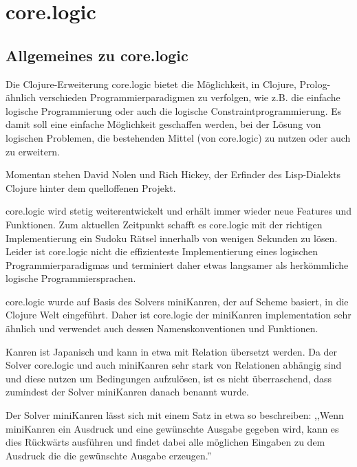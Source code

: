 \section{core.logic} 

\subsection{Allgemeines zu core.logic}

Die Clojure-Erweiterung core.logic bietet die Möglichkeit, in Clojure, Prolog-ähnlich verschieden Programmierparadigmen zu verfolgen, wie z.B. die einfache logische Programmierung oder auch die logische Constraintprogrammierung. Es damit soll eine einfache Möglichkeit geschaffen werden, bei der Lösung von logischen Problemen, die bestehenden Mittel (von core.logic) zu nutzen oder auch zu erweitern.

Momentan stehen David Nolen und Rich Hickey, der Erfinder des Lisp-Dialekts Clojure hinter dem quelloffenen Projekt.

core.logic wird stetig weiterentwickelt und erhält immer wieder neue Features und Funktionen. Zum aktuellen Zeitpunkt schafft es core.logic mit der richtigen Implementierung ein Sudoku Rätsel innerhalb von wenigen Sekunden zu lösen. Leider ist core.logic nicht die effizienteste Implementierung eines logischen Programmierparadigmas und terminiert daher etwas langsamer als herkömmliche logische Programmiersprachen.

core.logic wurde auf Basis des Solvers miniKanren, der auf Scheme basiert, in die Clojure Welt eingeführt. Daher ist core.logic der miniKanren implementation sehr ähnlich und verwendet auch dessen Namenskonventionen und Funktionen.

Kanren ist Japanisch und kann in etwa mit Relation übersetzt werden. Da der Solver core.logic und auch miniKanren sehr stark von Relationen abhängig sind und diese nutzen um Bedingungen aufzulösen, ist es nicht überraschend, dass zumindest der Solver miniKanren danach benannt wurde.

Der Solver miniKanren lässt sich mit einem Satz in etwa so beschreiben:
,,Wenn miniKanren ein Ausdruck und eine gewünschte Ausgabe gegeben wird, kann es dies Rückwärts ausführen und findet dabei alle möglichen Eingaben zu dem Ausdruck die die gewünschte Ausgabe erzeugen.''
